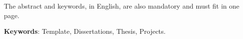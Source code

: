 The abstract and keywords, in English, are also mandatory and must fit in one page.
\vspace{\onelineskip}
 
\noindent 
\textbf{Keywords}: Template, Dissertations, Thesis, Projects.
